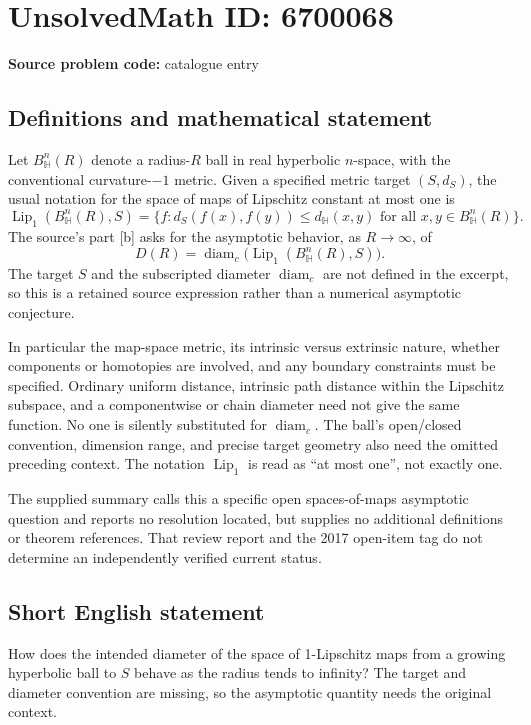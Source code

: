 \documentclass[11pt]{article}
\begin{document}
\section*{UnsolvedMath ID: 6700068}
\textbf{Source problem code:} catalogue entry
\subsection{Definitions and mathematical statement}
Let \(B_{\mathbb H}^n(R)\) denote a radius-\(R\) ball in real hyperbolic \(n\)-space, with the conventional curvature-\(-1\) metric. Given a specified metric target \((S,d_S)\), the usual notation for the space of maps of Lipschitz constant at most one is
\[
 \operatorname{Lip}_1(B_{\mathbb H}^n(R),S)=
 \{f:d_S(f(x),f(y))\le d_{\mathbb H}(x,y)\text{ for all }x,y\in B_{\mathbb H}^n(R)\}.
\]
The source's part [b] asks for the asymptotic behavior, as \(R\to\infty\), of
\[
 D(R)=\operatorname{diam}_c\bigl(\operatorname{Lip}_1(B_{\mathbb H}^n(R),S)\bigr).
\]
The target \(S\) and the subscripted diameter \(\operatorname{diam}_c\) are not defined in the excerpt, so this is a retained source expression rather than a numerical asymptotic conjecture.

In particular the map-space metric, its intrinsic versus extrinsic nature, whether components or homotopies are involved, and any boundary constraints must be specified. Ordinary uniform distance, intrinsic path distance within the Lipschitz subspace, and a componentwise or chain diameter need not give the same function. No one is silently substituted for \(\operatorname{diam}_c\). The ball's open/closed convention, dimension range, and precise target geometry also need the omitted preceding context. The notation \(\operatorname{Lip}_1\) is read as ``at most one'', not exactly one.

The supplied summary calls this a specific open spaces-of-maps asymptotic question and reports no resolution located, but supplies no additional definitions or theorem references. That review report and the 2017 open-item tag do not determine an independently verified current status.
\subsection{Short English statement}
How does the intended diameter of the space of 1-Lipschitz maps from a growing hyperbolic ball to \(S\) behave as the radius tends to infinity? The target and diameter convention are missing, so the asymptotic quantity needs the original context.
\end{document}
